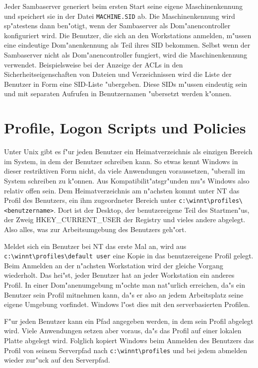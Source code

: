 \documentclass{scrartcl}\usepackage{pslatex}\typearea{12}
\newcommand{\dateistyle}{\texttt}
\begin{document}
Jeder Sambaserver generiert beim ersten Start seine eigene
Maschinenkennung und speichert sie in der Datei
\dateistyle{MACHINE.SID} ab. Die Maschinenkennung wird sp"atestens
dann ben"otigt, wenn der Sambaserver als Dom"anencontroller
konfiguriert wird. Die Benutzer, die sich an den Workstations
anmelden, m"ussen eine eindeutige Dom"anenkennung als Teil ihres SID
bekommen. Selbst wenn der Sambaserver nicht als Dom"anencontroller
fungiert, wird die Maschinenkennung verwendet. Beispielsweise bei der
Anzeige der ACLs in den Sicherheitseigenschaften von Dateien und
Verzeichnissen wird die Liste der Benutzer in Form eine SID-Liste
"ubergeben. Diese SIDs m"ussen eindeutig sein und mit separaten
Aufrufen in Benutzernamen "ubersetzt werden k"onnen.

\section{Profile, Logon Scripts und Policies}

Unter Unix gibt es f"ur jeden Benutzer ein Heimatverzeichnis als
einzigen Bereich im System, in dem der Benutzer schreiben kann. So
etwas kennt Windows in dieser restriktiven Form nicht, da viele
Anwendungen voraussetzen, "uberall im System schreiben zu k"onnen. Aus
Kompatibilit"atsgr"unden mu"s Windows also relativ offen sein. Dem
Heimatverzeichnis am n"achsten kommt unter NT das Profil des
Benutzers, ein ihm zugeordneter Bereich unter
\verb|c:\winnt\profiles\<benutzername>|. Dort ist der Desktop, der
benutzereigene Teil des Startmen"us, der Zweig HKEY\_CURRENT\_USER der
Registry und vieles andere abgelegt. Also alles, was zur
Arbeitsumgebung des Benutzers geh"ort.

Meldet sich ein Benutzer bei NT das erste Mal an, wird aus
\verb|c:\winnt\profiles\default user| eine Kopie in das benutzereigene
Profil gelegt. Beim Anmelden an der n"achsten Workstation wird der
gleiche Vorgang wiederholt. Das hei"st, jeder Benutzer hat an jeder
Workstation ein anderes Profil. In einer Dom"anenumgebung m"ochte man
nat"urlich erreichen, da"s ein Benutzer sein Profil mitnehmen kann,
da"s er also an jedem Arbeitsplatz seine eigene Umgebung vorfindet.
Windows l"ost dies mit den serverbasierten Profilen.

F"ur jeden Benutzer kann ein Pfad angegeben werden, in dem sein Profil
abgelegt wird. Viele Anwendungen setzen aber voraus, da"s das Profil auf
einer lokalen Platte abgelegt wird. Folglich kopiert Windows beim Anmelden
des Benutzers das Profil von seinem Serverpfad nach \verb|c:\winnt\profiles|
und bei jedem abmelden wieder zur"uck auf den Serverpfad.
\end{document}

